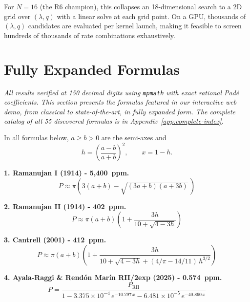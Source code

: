 \documentclass[12pt]{article}
\begin{document}
For $N = 16$ (the R6 champion), this collapses an 18-dimensional search to a 2D grid over $(\lambda,q)$ with a linear solve at each grid point. On a GPU, thousands of $(\lambda,q)$ candidates are evaluated per kernel launch, making it feasible to screen hundreds of thousands of rate combinations exhaustively.

\section{Fully Expanded Formulas}\label{sec:numerical}

\noindent\emph{All results verified at 150 decimal digits using \texttt{mpmath} with exact rational Pad\'e coefficients. This section presents the formulas featured in our interactive web demo, from classical to state-of-the-art, in fully expanded form. The complete catalog of all 55 discovered formulas is in Appendix~\ref{app:complete-index}.}

\medskip
\noindent In all formulas below, $a \ge b > 0$ are the semi-axes and
\[
h = \left(\frac{a-b}{a+b}\right)^{\!2}, \qquad x = 1 - h.
\]


\noindent\textbf{1. Ramanujan I (1914) - 5{,}400~ppm.}
\begin{equation}
P \approx \pi\!\left(3(a+b) - \sqrt{(3a+b)(a+3b)}\,\right)
\end{equation}

\bigskip

\noindent\textbf{2. Ramanujan II (1914) - 402~ppm.}
\begin{equation}
P \approx \pi(a{+}b)\!\left(1 + \frac{3h}{10 + \sqrt{4 - 3h}}\right)
\end{equation}

\bigskip

\noindent\textbf{3. Cantrell (2001) - 412~ppm.}
\begin{equation}
P \approx \pi(a{+}b)\!\left(1 + \frac{3h}{10 + \sqrt{4 - 3h} + (4/\pi - 14/11)\,h^{3/2}}\right)
\end{equation}

\bigskip

\noindent\textbf{4. Ayala-Raggi \& Rend\'on Mar\'in RII/2exp (2025) - 0.574~ppm.}
\begin{equation}
P = \frac{P_{\text{RII}}}{1 - 3.375{\times}10^{-4}\,e^{-10.297\,x} - 6.481{\times}10^{-5}\,e^{-40.890\,x}}
\end{equation}
\end{document}
